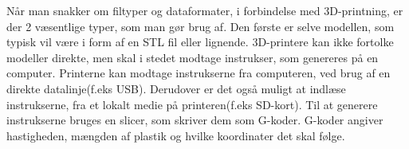 Når man snakker om filtyper og dataformater, i forbindelse med 3D-printning, er der 2 væsentlige typer, som man gør brug af. Den første er selve modellen, som typisk vil være i form af en STL fil eller lignende. 3D-printere kan ikke fortolke modeller direkte, men skal i stedet modtage instrukser, som genereres på en computer. Printerne kan modtage instrukserne fra computeren, ved brug af en direkte datalinje(f.eks USB). Derudover er det også muligt at indlæse instrukserne, fra et lokalt medie på printeren(f.eks SD-kort).
Til at generere instrukserne bruges en slicer, som skriver dem som G-koder. G-koder angiver hastigheden, mængden af plastik og hvilke koordinater det skal følge.